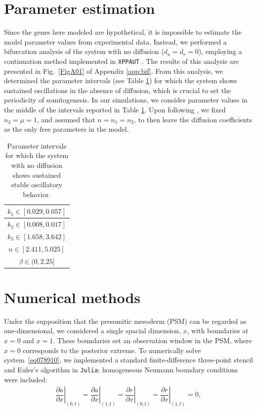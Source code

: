 \documentclass[%
 preprint,
 aip, 
 amsmath,amssymb,
]{revtex4-2}
\begin{document}
\section{Parameter estimation}
\label{param}
	
Since the genes here modeled are hypothetical, it is impossible to estimate the model parameter values from experimental data. Instead, we performed a bifurcation analysis of the system with no diffusion ($d_a = d_r = 0$), employing a continuation method implemented in \texttt{XPPAUT} \cite{Ermentrout1987}. The results of this analysis are presented in Fig.~\ref{FigA01} of Appendix \ref{app:bif}. From this analysis, we determined the parameter intervals (see Table \ref{Tab01}) for which the system shows sustained oscillations in the absence of diffusion, which is crucial to set the periodicity of somitogenesis. In our simulations, we consider parameter values in the middle of the intervals reported in Table \ref{Tab01}. Upon following \cite{Cotterell2015}, we fixed $n_3 = \mu = 1$, and assumed that $n = n_1 = n_2$, to then leave the diffusion coefficients as the only free parameters in the model. 
	
	\begin{table}[h] 
		\centering
		\begin{tabular}{|c|} \hline
			$k_1  \in [0.029, 0.057]$ \\ \hline
			$k_2  \in [0.008, 0.017]$ \\ \hline 
			$k_3  \in [1.658, 3.642]$ \\ \hline
			$n  \in  [2.411, 5.025]$ \\  \hline
			$\beta  \in  (0, 2.25]$ \\   \hline
		\end{tabular} 
		
		\caption{Parameter intervals for which the system with no diffusion shows
			sustained stable oscillatory behavior.}
		\label{Tab01}
	\end{table}
	
\section{Numerical methods}
\label{numer}
	
Under the supposition that the presomitic mesoderm (PSM) can be regarded as one-dimensional, we considered a single spacial dimension, $x$, with boundaries at $x=0$ and $x=1$. These boundaries set an observation window in the PSM, where $x=0$ corresponds to the posterior extreme. To numerically solve system~\eqref{eq078910}, we implemented a standard finite-difference three-point stencil and Euler's algorithm in \texttt{Julia}; homogeneous Neumann boundary conditions were included:
	\begin{gather}\label{eqbn}
	\left. \dfrac{\partial a}{\partial x}\right|_{(0, t)} = 
	\left. \dfrac{\partial a}{\partial x}\right|_{(1, t)} = 
	\left. \dfrac{\partial r}{\partial x}\right|_{(0, t)} =
	\left. \dfrac{\partial r}{\partial x}\right|_{(1, t)} = 0 ,
	\end{gather}
		
\end{document}
